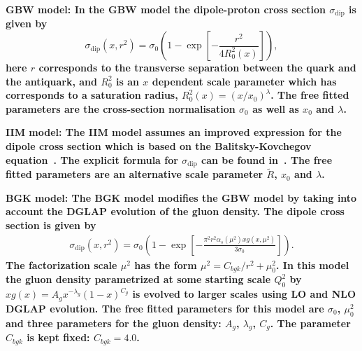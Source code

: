 \begin{description}
\item \bf {GBW model:} \rm
In the GBW model the dipole-proton cross section $\sigma_{\text{dip}}$ is given by
\begin{equation}
\label{eGBW}
   \sigma_{\text{dip}}(x,r^{2}) = \sigma_{0} \left(1 - \exp \left[-\frac{r^{2}}{4R_{0}^{2}(x)} \right]\right),
\end{equation}
here $r$ corresponds to the transverse separation between the quark and the antiquark, and $R_{0}^{2}$
 is 
an $x$ dependent scale parameter which has corresponds to a saturation radius,  $R_{0}^{2}(x)=\left(x/x_{0}\right)^{\lambda}$.
The free fitted parameters are the cross-section normalisation $\sigma_{0}$ as well as $x_{0}$ and $\lambda$.

\vspace{0.1cm}
\item \bf {IIM model:} \rm
The IIM model assumes an improved expression for the dipole cross section which is based on the 
Balitsky-Kovchegov equation~\cite{Balitsky:1995ub}. The explicit formula for $\sigma_{\text{dip}}$ 
can be found in~\cite{Iancu:2003ge}. The free fitted parameters are an alternative scale parameter $\tilde{R}$, $x_{0}$ and $\lambda$.

\vspace{0.1cm}
\item \bf {BGK model:} \rm
The BGK model modifies the GBW model by taking into account the  DGLAP evolution
of the gluon density. 
The dipole cross section is given by
\begin{equation}
\begin{array}{lcl}
   \sigma_{\text{dip}}(x,r^{2})  =  \sigma_{0} 
\left(1 - \exp \left[-\frac{\pi^{2} r^{2} \alpha_{s}(\mu^{2}) xg(x,\mu^{2})}{3 \sigma_{0}} \right]\right).
\end{array}
\label{eBGK}
\end{equation}
The factorization scale $\mu^{2}$ has the form $\mu^{2} = C_{bgk}/r^{2}+\mu^{2}_{0}$.
In this model the gluon density parametrized at some starting scale $Q_{0}^{2}$ by
$ xg(x) = A_{g} x^{-\lambda_{g}}(1-x)^{C_{g}} $
is evolved to larger scales using LO and NLO DGLAP evolution.
The free fitted parameters for this model are $\sigma_{0}$, $\mu^{2}_{0}$ and three parameters for the gluon density: $A_{g}$, $\lambda_{g}$, $C_{g}$. The parameter $C_{bgk}$ is kept fixed: $C_{bgk} = 4.0$. 


\end{description}
